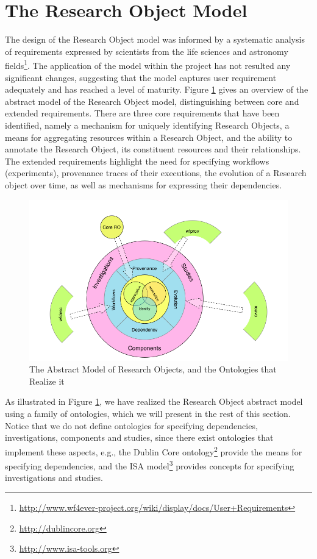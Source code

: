 \section{The Research Object Model}
\label{sec:romodel}

The design of the Research Object model was informed by a systematic analysis of requirements expressed by scientists from the life sciences and astronomy fields\footnote{\url{http://www.wf4ever-project.org/wiki/display/docs/User+Requirements}}. The application of the model within the project has not resulted any significant changes, suggesting that the model captures user requirement adequately and has reached a level of maturity. Figure \ref{fig:wm_abstract} gives an overview of the abstract model of the Research Object model, distinguishing between core and extended requirements. There are three core requirements that have been identified, namely a mechanism for uniquely identifying Research Objects, a means for aggregating resources within a Research Object, and the ability to annotate the Research Object, its constituent resources and their relationships. The extended requirements highlight the need for specifying workflows (experiments), provenance traces of their executions, the evolution of a Research object over time, as well as mechanisms for expressing their dependencies. 


\begin{figure}[ht]
  \centering
  \includegraphics[width=.8\textwidth]{Figures/ro-model.png}
  \caption{The Abstract Model of Research Objects, and the Ontologies that Realize it}
  \label{fig:wm_abstract}
\end{figure}

As illustrated in Figure \ref{fig:wm_abstract}, we have realized the Research Object abstract model using  a family of ontologies, which we will present in the rest of this section. Notice that we do not define ontologies for specifying dependencies, investigations, components and studies, since there exist ontologies that implement these aspects, e.g., the Dublin Core ontology\footnote{\url{http://dublincore.org}} provide the means for specifying dependencies, and the ISA model\footnote{\url{http://www.isa-tools.org}} provides concepts for specifying investigations and studies.


